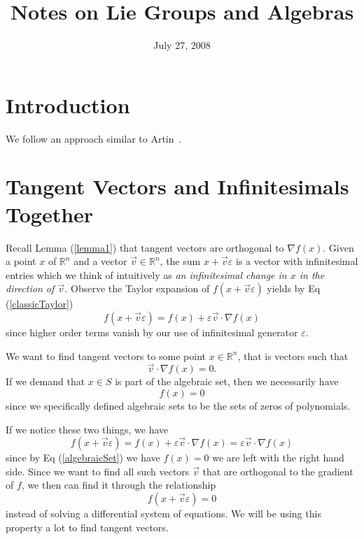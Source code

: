 \documentclass{amsart}
\title{Notes on Lie Groups and Algebras}
\date{July 27, 2008}
\begin{document}
\maketitle
\tableofcontents
\section{Introduction}

We follow an approach similar to Artin~\cite{ArtinBk01}.




\section{Tangent Vectors and Infinitesimals Together}

Recall Lemma (\ref{lemma1}) that tangent vectors are orthogonal to $\nabla f(x)$.
Given a point $x$ of $\mathbb{R}^n$ and a vector $\vec{v}\in\mathbb{R}^n$, the
sum $x + \vec{v}\varepsilon$ is a vector with infinitesimal entries which we
think of intuitively as \emph{an infinitesimal change in $x$ in the direction of
$\vec{v}$.} Observe the Taylor expansion of $f(x + \vec{v}\varepsilon)$ yields by
Eq (\ref{classicTaylor})
\begin{equation}
f(x + \vec{v}\varepsilon) = f(x) + \varepsilon\vec{v}\cdot\nabla f(x)
\end{equation}
since higher order terms vanish by our use of infinitesimal generator $\varepsilon$.

We want to find tangent vectors to some point $x\in\mathbb{R}^n$, that is vectors such that
\begin{equation}
\vec{v}\cdot\nabla f(x) = 0.
\end{equation}
If we demand that $x\in S$ is part of the algebraic set, then we necessarily
have
\begin{equation}\label{algebraicSet}
f(x) = 0
\end{equation}
since we specifically defined algebraic sets to be the sets of zeros of 
polynomials.

If we notice these two things, we have
\begin{equation}
f(x + \vec{v}\varepsilon) = f(x) + \varepsilon\vec{v}\cdot\nabla f(x) = \varepsilon\vec{v}\cdot\nabla f(x)
\end{equation}
since by Eq (\ref{algebraicSet}) we have $f(x)=0$ we are left with the right
hand side. Since we want to find all such vectors $\vec{v}$ that are orthogonal
to the gradient of $f$, we then can find it through the relationship
\begin{equation}
f(x + \vec{v}\varepsilon) = 0
\end{equation}
instead of solving a differential system of equations. We will be using this 
property a lot to find tangent vectors.
\end{document}
